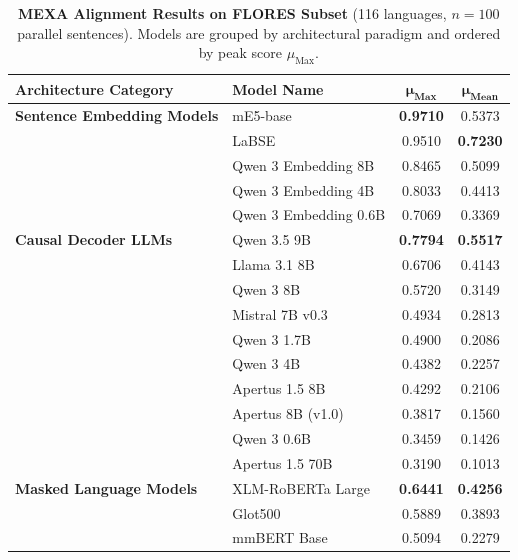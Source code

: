 \begin{table}[t]
\centering
\caption{\textbf{MEXA Alignment Results on FLORES Subset} (116 languages, $n = 100$ parallel sentences). Models are grouped by architectural paradigm and ordered by peak score $\mu_{\text{Max}}$.}
\label{tab:mexa-flores-table1}
\begin{tabular}{llcc}
\toprule
\textbf{Architecture Category} & \textbf{Model Name} & $\mathbf{\mu_{\text{Max}}}$ & $\mathbf{\mu_{\text{Mean}}}$ \\
\midrule
\textbf{Sentence Embedding Models}
  & mE5-base & \textbf{0.9710} & 0.5373 \\
  & LaBSE & 0.9510 & \textbf{0.7230} \\
  & Qwen 3 Embedding 8B & 0.8465 & 0.5099 \\
  & Qwen 3 Embedding 4B & 0.8033 & 0.4413 \\
  & Qwen 3 Embedding 0.6B & 0.7069 & 0.3369 \\
\midrule
\textbf{Causal Decoder LLMs}
  & Qwen 3.5 9B & \textbf{0.7794} & \textbf{0.5517} \\
  & Llama 3.1 8B & 0.6706 & 0.4143 \\
  & Qwen 3 8B & 0.5720 & 0.3149 \\
  & Mistral 7B v0.3 & 0.4934 & 0.2813 \\
  & Qwen 3 1.7B & 0.4900 & 0.2086 \\
  & Qwen 3 4B & 0.4382 & 0.2257 \\
  & Apertus 1.5 8B & 0.4292 & 0.2106 \\
  & Apertus 8B (v1.0) & 0.3817 & 0.1560 \\
  & Qwen 3 0.6B & 0.3459 & 0.1426 \\
  & Apertus 1.5 70B & 0.3190 & 0.1013 \\
\midrule
\textbf{Masked Language Models}
  & XLM-RoBERTa Large & \textbf{0.6441} & \textbf{0.4256} \\
  & Glot500 & 0.5889 & 0.3893 \\
  & mmBERT Base & 0.5094 & 0.2279 \\
\bottomrule
\end{tabular}
\end{table}

